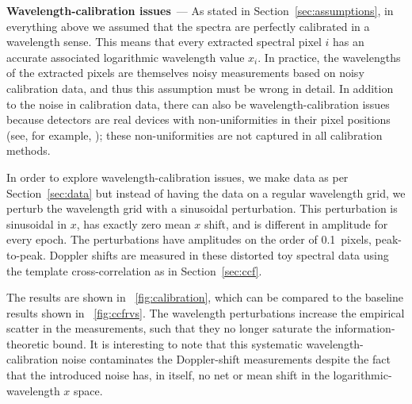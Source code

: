 \documentclass[modern]{aastex631}
\renewcommand{\paragraph}[1]{\bigskip\noindent\textbf{#1}~---}
\newcommand{\sectionname}{Section}
\newcommand{\secref}[1]{\sectionname~\ref{#1}}
\newcommand{\figref}[1]{\figurename~\ref{#1}}
\begin{document}
\paragraph{Wavelength-calibration issues}
As stated in \secref{sec:assumptions}, in everything above we assumed that the spectra are perfectly calibrated in a wavelength sense.
This means that every extracted spectral pixel $i$ has an accurate associated logarithmic wavelength value $x_i$.
In practice, the wavelengths of the extracted pixels are themselves noisy measurements based on noisy calibration data, and thus this assumption must be wrong in detail.
In addition to the noise in calibration data, there can also be wavelength-calibration issues because detectors are real devices with non-uniformities in their pixel positions (see, for example, \citealt{excalibur}); these non-uniformities are not captured in all calibration methods.

In order to explore wavelength-calibration issues, we make data as per \secref{sec:data} but instead of having the data on a regular wavelength grid, we perturb the wavelength grid with a sinusoidal perturbation.
This perturbation is sinusoidal in $x$, has exactly zero mean $x$ shift, and is different in amplitude for every epoch.
The perturbations have amplitudes on the order of 0.1~pixels, peak-to-peak.
Doppler shifts are measured in these distorted toy spectral data using the template cross-correlation as in \secref{sec:ccf}.

The results are shown in \figref{fig:calibration}, which can be compared to the baseline results shown in \figref{fig:ccfrvs}.
The wavelength perturbations increase the empirical scatter in the measurements, such that they no longer saturate the information-theoretic bound.
It is interesting to note that this systematic wavelength-calibration noise contaminates the Doppler-shift measurements despite the fact that the introduced noise has, in itself, no net or mean shift in the logarithmic-wavelength $x$ space.
\end{document}
